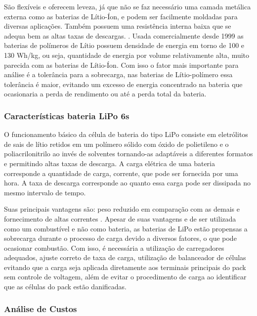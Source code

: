 São flexíveis e oferecem leveza, já que não se faz necessário uma camada metálica externa como as baterias de 
Lítio-Íon, e podem ser facilmente moldadas para diversas aplicações. Também possuem uma resistência interna 
baixa que se adequa bem as altas taxas de descargas. \cite{costa}. Usada comercialmente desde 1999 as baterias 
de polímeros de Lítio possuem densidade de energia em torno de 100 e 130 Wh/kg, ou seja, quantidade de energia 
por volume relativamente alta, muito parecida com as baterias de Lítio-Íon. Com isso o fator mais importante para
análise é a tolerância para a sobrecarga, nas baterias de Lítio-polímero essa tolerância é maior, evitando um 
excesso de energia concentrado na bateria que ocasionaria a perda de rendimento ou até a perda total da bateria.
\cite{costa}

\subsubsection{Características bateria LiPo 6s}

O funcionamento básico da célula de bateria do tipo LiPo consiste em eletrólitos de sais de lítio retidos
em um polímero sólido com óxido de polietileno e o poliacrilonitrilo ao invés de solventes tornando-as
adaptáveis a diferentes formatos e permitindo altas taxas de descarga. A carga elétrica de uma bateria
corresponde a quantidade de carga, corrente, que pode ser fornecida por uma hora. 
A taxa de descarga corresponde ao quanto essa carga pode ser dissipada no mesmo intervalo de tempo. \cite{gibbs}

Suas principais vantagens são: peso reduzido em comparação com as demais e fornecimento de altas correntes 
\cite{pinto}. Apesar de suas vantagens e de ser utilizada como um combustível e não como bateria,
as baterias de LiPo estão propensas a sobrecarga durante o processo de carga devido a diversos fatores, 
o que pode ocasionar combustão. Com isso, é necessária a utilização de carregadores adequados, ajuste correto 
de taxa de carga, utilização de balanceador de células evitando que a carga seja aplicada diretamente aos 
terminais principais do pack sem controle de voltagem, além de evitar o procedimento de carga ao identificar 
que as células do pack estão danificadas. \cite{gibbs}

\subsubsection{Análise de Custos}

